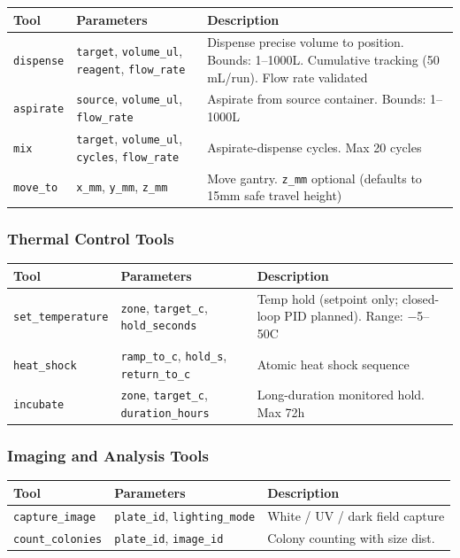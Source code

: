 \documentclass[11pt,letterpaper]{article}
\begin{document}
{\centering\begin{tabularx}{\textwidth}{L{3.3cm} L{5.4cm} Y}
\toprule
\textbf{Tool} & \textbf{Parameters} & \textbf{Description} \\
\midrule
\texttt{dispense} & \texttt{target}, \texttt{volume\_ul}, \texttt{reagent}, \texttt{flow\_rate} & Dispense precise volume to position. Bounds: 1--1000\textmu{}L. Cumulative tracking (50\,mL/run). Flow rate validated \\
\texttt{aspirate} & \texttt{source}, \texttt{volume\_ul}, \texttt{flow\_rate} & Aspirate from source container. Bounds: 1--1000\textmu{}L \\
\texttt{mix} & \texttt{target}, \texttt{volume\_ul}, \texttt{cycles}, \texttt{flow\_rate} & Aspirate-dispense cycles. Max 20 cycles \\
\texttt{move\_to} & \texttt{x\_mm}, \texttt{y\_mm}, \texttt{z\_mm} & Move gantry. \texttt{z\_mm} optional (defaults to 15mm safe travel height) \\
\bottomrule
\end{tabularx}\par}

\subsubsection{Thermal Control Tools}

{\centering\begin{tabularx}{\textwidth}{L{3.3cm} L{5.4cm} Y}
\toprule
\textbf{Tool} & \textbf{Parameters} & \textbf{Description} \\
\midrule
\texttt{set\_temperature} & \texttt{zone}, \texttt{target\_c}, \texttt{hold\_seconds} & Temp hold (setpoint only; closed-loop PID planned). Range: $-$5--50\textdegree{}C \\
\texttt{heat\_shock} & \texttt{ramp\_to\_c}, \texttt{hold\_s}, \texttt{return\_to\_c} & Atomic heat shock sequence \\
\texttt{incubate} & \texttt{zone}, \texttt{target\_c}, \texttt{duration\_hours} & Long-duration monitored hold. Max 72h \\
\bottomrule
\end{tabularx}\par}

\subsubsection{Imaging and Analysis Tools}

{\centering\begin{tabularx}{\textwidth}{L{3.3cm} L{5.4cm} Y}
\toprule
\textbf{Tool} & \textbf{Parameters} & \textbf{Description} \\
\midrule
\texttt{capture\_image} & \texttt{plate\_id}, \texttt{lighting\_mode} & White / UV / dark field capture \\
\texttt{count\_colonies} & \texttt{plate\_id}, \texttt{image\_id} & Colony counting with size dist. \\
\bottomrule
\end{tabularx}\par}
\end{document}
